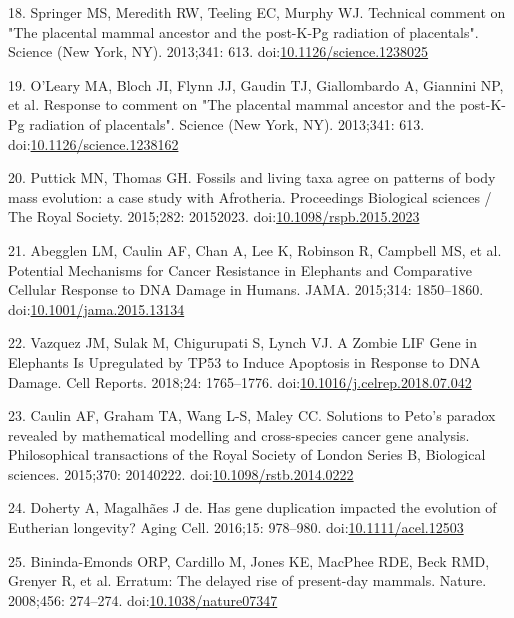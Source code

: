 \documentclass[]{elsarticle} %
\begin{document}
\leavevmode\hypertarget{ref-Springer2013}{}%
18. Springer MS, Meredith RW, Teeling EC, Murphy WJ. Technical comment
on "The placental mammal ancestor and the post-K-Pg radiation of
placentals". Science (New York, NY). 2013;341: 613.
doi:\href{https://doi.org/10.1126/science.1238025}{10.1126/science.1238025}

\leavevmode\hypertarget{ref-OLeary2013b}{}%
19. O'Leary MA, Bloch JI, Flynn JJ, Gaudin TJ, Giallombardo A, Giannini
NP, et al. Response to comment on "The placental mammal ancestor and the
post-K-Pg radiation of placentals". Science (New York, NY). 2013;341:
613.
doi:\href{https://doi.org/10.1126/science.1238162}{10.1126/science.1238162}

\leavevmode\hypertarget{ref-PuttickAndThomas2015}{}%
20. Puttick MN, Thomas GH. Fossils and living taxa agree on patterns of
body mass evolution: a case study with Afrotheria. Proceedings
Biological sciences / The Royal Society. 2015;282: 20152023.
doi:\href{https://doi.org/10.1098/rspb.2015.2023}{10.1098/rspb.2015.2023}

\leavevmode\hypertarget{ref-Abegglen:JAMA2015}{}%
21. Abegglen LM, Caulin AF, Chan A, Lee K, Robinson R, Campbell MS, et
al. Potential Mechanisms for Cancer Resistance in Elephants and
Comparative Cellular Response to DNA Damage in Humans. JAMA. 2015;314:
1850--1860.
doi:\href{https://doi.org/10.1001/jama.2015.13134}{10.1001/jama.2015.13134}

\leavevmode\hypertarget{ref-Vazquez2018}{}%
22. Vazquez JM, Sulak M, Chigurupati S, Lynch VJ. A Zombie LIF Gene in
Elephants Is Upregulated by TP53 to Induce Apoptosis in Response to DNA
Damage. Cell Reports. 2018;24: 1765--1776.
doi:\href{https://doi.org/10.1016/j.celrep.2018.07.042}{10.1016/j.celrep.2018.07.042}

\leavevmode\hypertarget{ref-Caulin2015}{}%
23. Caulin AF, Graham TA, Wang L-S, Maley CC. Solutions to Peto's
paradox revealed by mathematical modelling and cross-species cancer gene
analysis. Philosophical transactions of the Royal Society of London
Series B, Biological sciences. 2015;370: 20140222.
doi:\href{https://doi.org/10.1098/rstb.2014.0222}{10.1098/rstb.2014.0222}

\leavevmode\hypertarget{ref-Doherty2016}{}%
24. Doherty A, Magalhães J de. Has gene duplication impacted the
evolution of Eutherian longevity? Aging Cell. 2016;15: 978--980.
doi:\href{https://doi.org/10.1111/acel.12503}{10.1111/acel.12503}

\leavevmode\hypertarget{ref-Bininda-Emonds2008}{}%
25. Bininda-Emonds ORP, Cardillo M, Jones KE, MacPhee RDE, Beck RMD,
Grenyer R, et al. Erratum: The delayed rise of present-day mammals.
Nature. 2008;456: 274--274.
doi:\href{https://doi.org/10.1038/nature07347}{10.1038/nature07347}
\end{document}
